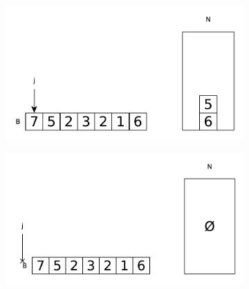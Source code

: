 \begin{figure}
\begin{subfigure}[t]{0.49\textwidth}
\begin{framed}
			\includegraphics[width=1\linewidth]{sources/next_greater_element/images/stack6}
		\end{framed}
		\caption{}
		\label{fig:next_greater:variation1:stack1}
	 \end{subfigure}
	 \hfill
	 \begin{subfigure}[t]{0.49\textwidth}
		\begin{framed}
			\includegraphics[width=1\linewidth]{sources/next_greater_element/images/stack7}
		\end{framed}
		\caption{}
		\label{fig:next_greater:variation1:stack1}
	 \end{subfigure}
	 \caption[]{}
	  \label{fig:cycle_in_list:floyd}
\end{figure}